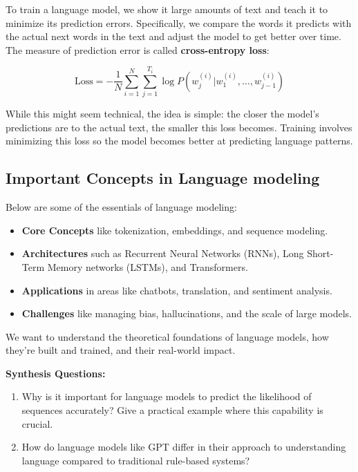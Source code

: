     \large To train a language model, we show it large amounts of text and teach it to minimize its prediction errors. Specifically, we compare the words it predicts with the actual next words in the text and adjust the model to get better over time. The measure of prediction error is called \textbf{cross-entropy loss}:

    \[
    \text{Loss} = - \frac{1}{N} \sum_{i=1}^N \sum_{j=1}^{T_i} \log P(w_j^{(i)} | w_{1}^{(i)}, \dots, w_{j-1}^{(i)})
    \]

    While this might seem technical, the idea is simple: the closer the model’s predictions are to the actual text, the smaller this loss becomes. Training involves minimizing this loss so the model becomes better at predicting language patterns.

\subsection{Important Concepts in Language modeling}

    \large Below are some of the essentials of language modeling:
    \begin{itemize}
        \item \textbf{Core Concepts} like tokenization, embeddings, and sequence modeling.
        \item \textbf{Architectures} such as Recurrent Neural Networks (RNNs), Long Short-Term Memory networks (LSTMs), and Transformers.
        \item \textbf{Applications} in areas like chatbots, translation, and sentiment analysis.
        \item \textbf{Challenges} like managing bias, hallucinations, and the scale of large models.
    \end{itemize}
    We want to understand the theoretical foundations of language models, how they’re built and trained, and their real-world impact.

\begin{questionbox}
\textbf{Synthesis Questions:}
\begin{enumerate}
    \item Why is it important for language models to predict the likelihood of sequences accurately? Give a practical example where this capability is crucial.
    \item How do language models like GPT differ in their approach to understanding language compared to traditional rule-based systems?
\end{enumerate}
\end{questionbox}



